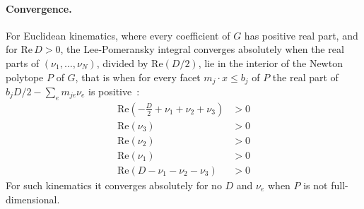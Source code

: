 \documentclass[11pt,a4paper]{article}
\begin{document}
\paragraph{Convergence.}
For Euclidean kinematics, where every coefficient of $G$ has positive real part, and for $\mathrm{Re}\,D > 0$, the Lee-Pomeransky integral converges absolutely when the real parts of $(\nu_1, \ldots, \nu_N)$, divided by $\mathrm{Re}(D/2)$, lie in the interior of the Newton polytope $P$ of $G$, that is when for every facet $m_j \cdot x \le b_j$ of $P$ the real part of $b_j D/2 - \sum_e m_{je} \nu_e$ is positive~\cite{klausen2023}:
\begin{align*}
\mathrm{Re}\left(- \frac{D}{2} + \nu_{1} + \nu_{2} + \nu_{3}\right) &> 0 \\
\mathrm{Re}\left(\nu_{3}\right) &> 0 \\
\mathrm{Re}\left(\nu_{2}\right) &> 0 \\
\mathrm{Re}\left(\nu_{1}\right) &> 0 \\
\mathrm{Re}\left(D - \nu_{1} - \nu_{2} - \nu_{3}\right) &> 0
\end{align*}
For such kinematics it converges absolutely for no $D$ and $\nu_e$ when $P$ is not full-dimensional.
\end{document}

